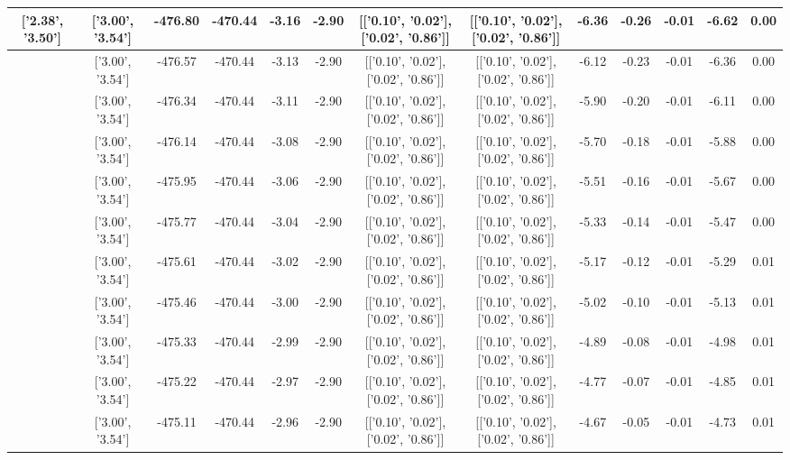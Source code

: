 \begin{table}[htbp]
\begin{adjustbox}{angle=90}
\begin{tabular}{|c|c|c|c|c|c|c|c|c|c|c|c|c|}
 ['2.38', '3.50'] & ['3.00', '3.54'] & -476.80 & -470.44 & -3.16 & -2.90 & [['0.10', '0.02'], ['0.02', '0.86']] & [['0.10', '0.02'], ['0.02', '0.86']] & -6.36 & -0.26 & -0.01 & -6.62 & 0.00\\ \hline
 ['2.41', '3.50'] & ['3.00', '3.54'] & -476.57 & -470.44 & -3.13 & -2.90 & [['0.10', '0.02'], ['0.02', '0.86']] & [['0.10', '0.02'], ['0.02', '0.86']] & -6.12 & -0.23 & -0.01 & -6.36 & 0.00\\ \hline
 ['2.45', '3.50'] & ['3.00', '3.54'] & -476.34 & -470.44 & -3.11 & -2.90 & [['0.10', '0.02'], ['0.02', '0.86']] & [['0.10', '0.02'], ['0.02', '0.86']] & -5.90 & -0.20 & -0.01 & -6.11 & 0.00\\ \hline
 ['2.49', '3.51'] & ['3.00', '3.54'] & -476.14 & -470.44 & -3.08 & -2.90 & [['0.10', '0.02'], ['0.02', '0.86']] & [['0.10', '0.02'], ['0.02', '0.86']] & -5.70 & -0.18 & -0.01 & -5.88 & 0.00\\ \hline
 ['2.53', '3.51'] & ['3.00', '3.54'] & -475.95 & -470.44 & -3.06 & -2.90 & [['0.10', '0.02'], ['0.02', '0.86']] & [['0.10', '0.02'], ['0.02', '0.86']] & -5.51 & -0.16 & -0.01 & -5.67 & 0.00\\ \hline
 ['2.56', '3.51'] & ['3.00', '3.54'] & -475.77 & -470.44 & -3.04 & -2.90 & [['0.10', '0.02'], ['0.02', '0.86']] & [['0.10', '0.02'], ['0.02', '0.86']] & -5.33 & -0.14 & -0.01 & -5.47 & 0.00\\ \hline
 ['2.60', '3.51'] & ['3.00', '3.54'] & -475.61 & -470.44 & -3.02 & -2.90 & [['0.10', '0.02'], ['0.02', '0.86']] & [['0.10', '0.02'], ['0.02', '0.86']] & -5.17 & -0.12 & -0.01 & -5.29 & 0.01\\ \hline
 ['2.64', '3.52'] & ['3.00', '3.54'] & -475.46 & -470.44 & -3.00 & -2.90 & [['0.10', '0.02'], ['0.02', '0.86']] & [['0.10', '0.02'], ['0.02', '0.86']] & -5.02 & -0.10 & -0.01 & -5.13 & 0.01\\ \hline
 ['2.68', '3.52'] & ['3.00', '3.54'] & -475.33 & -470.44 & -2.99 & -2.90 & [['0.10', '0.02'], ['0.02', '0.86']] & [['0.10', '0.02'], ['0.02', '0.86']] & -4.89 & -0.08 & -0.01 & -4.98 & 0.01\\ \hline
 ['2.72', '3.52'] & ['3.00', '3.54'] & -475.22 & -470.44 & -2.97 & -2.90 & [['0.10', '0.02'], ['0.02', '0.86']] & [['0.10', '0.02'], ['0.02', '0.86']] & -4.77 & -0.07 & -0.01 & -4.85 & 0.01\\ \hline
 ['2.75', '3.52'] & ['3.00', '3.54'] & -475.11 & -470.44 & -2.96 & -2.90 & [['0.10', '0.02'], ['0.02', '0.86']] & [['0.10', '0.02'], ['0.02', '0.86']] & -4.67 & -0.05 & -0.01 & -4.73 & 0.01\\ \hline

\end{tabular}
\end{adjustbox}
\end{table}
